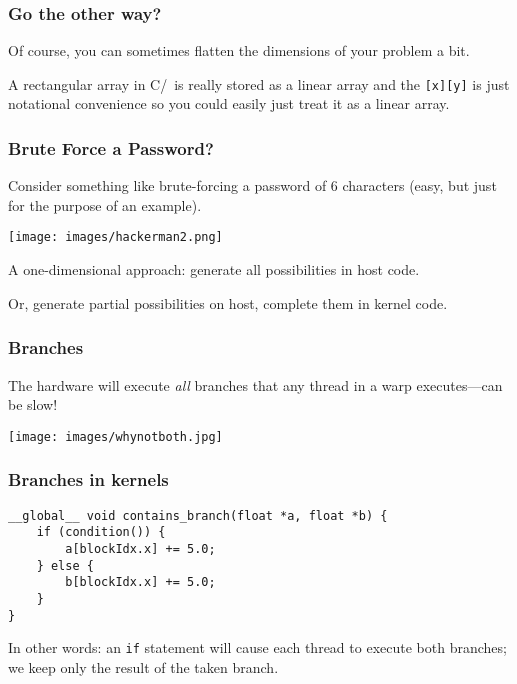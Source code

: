 \begin{frame}
\frametitle{Go the other way?}

Of course, you can sometimes flatten the dimensions of your problem a bit. 

A rectangular array in C/\CPP~is really stored as a linear array and the \texttt{[x][y]} is just notational convenience so you could easily just treat it as a linear array.

\end{frame}


\begin{frame}
\frametitle{Brute Force a Password?}

Consider something like brute-forcing a password of 6 characters (easy, but just for the purpose of an example).

\begin{center}
	\texttt{[image: images/hackerman2.png]}
\end{center}

A one-dimensional approach: generate all possibilities in host code.

Or, generate partial possibilities on host, complete them in kernel code.


\end{frame}



\begin{frame}
\frametitle{Branches}

The hardware will execute \emph{all} branches that any thread in a warp
      executes---can be slow!\\[1em]


\begin{center}
	\texttt{[image: images/whynotboth.jpg]}
\end{center}

\end{frame}


\begin{frame}[fragile]
  \frametitle{Branches in kernels}

    \begin{lstlisting}
__global__ void contains_branch(float *a, float *b) {
    if (condition()) {
        a[blockIdx.x] += 5.0;
    } else {
        b[blockIdx.x] += 5.0;
    }
}
\end{lstlisting}

    
    In other words: an {\tt if} statement will cause each thread to execute
      both branches; we keep only the result of the taken branch.\\[1em]


\end{frame}

